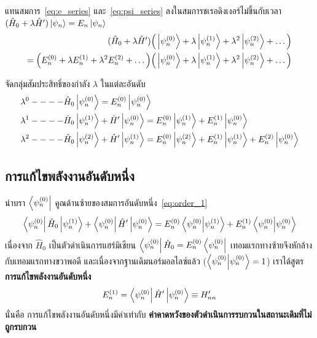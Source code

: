 แทนสมการ~\eqref{eq:e_series} และ~\eqref{eq:psi_series} ลงในสมการชเรอดิงเงอร์ไม่ขึ้นกับเวลา $(\hat{H}_0 + \lambda \hat{H}')\ket{\psi_n} = E_n \ket{\psi_n}$
\begin{align}
(\hat{H}_0 + \lambda \hat{H}') \Big( \ket{\psi_n^{(0)}} + \lambda \ket{\psi_n^{(1)}} + \lambda^2 \ket{\psi_n^{(2)}} + \dots \Big) \nonumber \\
= \Big( E_n^{(0)} + \lambda E_n^{(1)} + \lambda^2 E_n^{(2)} + \dots \Big) \Big( \ket{\psi_n^{(0)}} + \lambda \ket{\psi_n^{(1)}} + \lambda^2 \ket{\psi_n^{(2)}} + \dots \Big)
\end{align}

จัดกลุ่มสัมประสิทธิ์ของกำลัง $\lambda$ ในแต่ละอันดับ
\begin{align}
\lambda^0 &---- \hat{H}_0 \ket{\psi_n^{(0)}} = E_n^{(0)} \ket{\psi_n^{(0)}} \label{eq:order_0} \\
\lambda^1 &---- \hat{H}_0 \ket{\psi_n^{(1)}} + \hat{H}' \ket{\psi_n^{(0)}} = E_n^{(0)} \ket{\psi_n^{(1)}} + E_n^{(1)} \ket{\psi_n^{(0)}} \label{eq:order_1} \\
\lambda^2 &---- \hat{H}_0 \ket{\psi_n^{(2)}} + \hat{H}' \ket{\psi_n^{(1)}} = E_n^{(0)} \ket{\psi_n^{(2)}} + E_n^{(1)} \ket{\psi_n^{(1)}} + E_n^{(2)} \ket{\psi_n^{(0)}} \label{eq:order_2}
\end{align}

\subsection{การแก้ไขพลังงานอันดับหนึ่ง}
นำบรา $\bra{\psi_n^{(0)}}$ คูณด้านซ้ายของสมการอันดับหนึ่ง~\eqref{eq:order_1}
\begin{equation}
\bra{\psi_n^{(0)}} \hat{H}_0 \ket{\psi_n^{(1)}} + \bra{\psi_n^{(0)}} \hat{H}' \ket{\psi_n^{(0)}} = E_n^{(0)} \braket{\psi_n^{(0)}}{\psi_n^{(1)}} + E_n^{(1)} \braket{\psi_n^{(0)}}{\psi_n^{(0)}}
\end{equation}
เนื่องจาก $\hat{H}_0$ เป็นตัวดำเนินการแฮร์มิเชียน $\bra{\psi_n^{(0)}}\hat{H}_0 = E_n^{(0)}\bra{\psi_n^{(0)}}$ เทอมแรกทางซ้ายจึงหักล้างกับเทอมแรกทางขวาพอดี และเนื่องจากฐานเดิมนอร์มอลไลซ์แล้ว ($\braket{\psi_n^{(0)}}{\psi_n^{(0)}} = 1$) เราได้สูตร \textbf{การแก้ไขพลังงานอันดับหนึ่ง}
\begin{equation}
E_n^{(1)} = \bra{\psi_n^{(0)}} \hat{H}' \ket{\psi_n^{(0)}} \equiv H'_{nn}
\label{eq:first_order_energy_formula}
\end{equation}
นั่นคือ การแก้ไขพลังงานอันดับหนึ่งมีค่าเท่ากับ \textbf{ค่าคาดหวังของตัวดำเนินการรบกวนในสถานะเดิมที่ไม่ถูกรบกวน}

